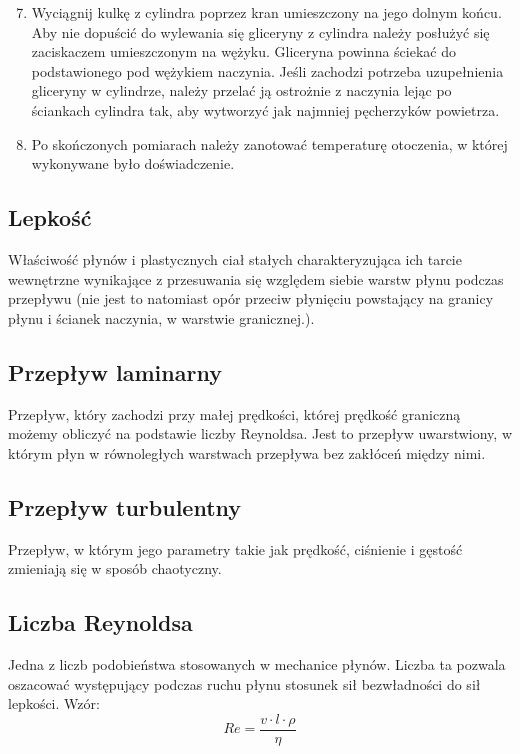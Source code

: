 \documentclass[a4paper,12pt]{article}
\begin{document}
\begin{justify}

\begin{enumerate}
\setcounter{enumi}{6}
\item Wyciągnij kulkę z cylindra poprzez kran umieszczony na jego dolnym końcu. Aby nie dopuścić do wylewania się gliceryny z cylindra należy posłużyć się zaciskaczem umieszczonym na wężyku. Gliceryna powinna ściekać do podstawionego pod wężykiem naczynia. Jeśli zachodzi potrzeba uzupełnienia gliceryny w cylindrze, należy przelać ją ostrożnie z naczynia lejąc po ściankach cylindra tak, aby wytworzyć jak najmniej pęcherzyków powietrza.
\item Po skończonych pomiarach należy zanotować temperaturę otoczenia, w której wykonywane było doświadczenie.
\end{enumerate}

\label{theory}

\subsection{Lepkość}
Właściwość płynów i plastycznych ciał stałych charakteryzująca ich tarcie wewnętrzne wynikające z przesuwania się względem siebie warstw płynu podczas przepływu (nie jest to natomiast opór przeciw płynięciu powstający na granicy płynu i ścianek naczynia, w warstwie granicznej.).  \cite{wspl}

\subsection{Przepływ laminarny}
Przepływ, który zachodzi przy małej prędkości, której prędkość graniczną możemy obliczyć na podstawie liczby Reynoldsa. Jest to przepływ uwarstwiony, w którym płyn w równoległych warstwach przepływa bez zakłóceń między nimi. \cite{pl}

\subsection{Przepływ turbulentny}
Przepływ, w którym jego parametry takie jak prędkość, ciśnienie i gęstość zmieniają się w sposób chaotyczny. \cite{pt}

\subsection{Liczba Reynoldsa}
Jedna z liczb podobieństwa stosowanych w mechanice płynów. Liczba ta pozwala oszacować występujący podczas ruchu płynu stosunek sił bezwładności do sił lepkości. \cite{reynolds} Wzór:
\begin{equation}
\label{wzr}
Re = \frac{v \cdot l \cdot \rho}{\eta}
\end{equation}


\end{justify}
\end{document}
